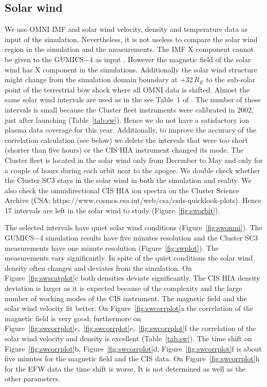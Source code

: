 \documentclass[linenumbers,draft]{agujournal}
\begin{document}
\subsection{Solar wind}
\label{sec:sw}

We use OMNI IMF and solar wind velocity, density and temperature data as input of the simulation. Nevertheless, it is not useless to compare the solar wind region in the simulation and the measurements. The IMF X component cannot be given to the GUMICS$-$4 as input \citep{janhunen12:_gumic_mhd,facsko16:_one_earth}. However the magnetic field of the solar wind has X component in the simulations. Additionally the solar wind structure might change from the simulation domain boundary at +32\,$R_E$ to the sub-solar point of the terrestrial bow shock where all OMNI data is shifted. Almost the same solar wind intervals are used as in the see Table~1 of \citet{facsko16:_one_earth}. The number of these intervals is small because the Cluster fleet instruments were calibrated in 2002, just after launching (Table~\ref{tab:sw}). Hence we do not have a satisfactory ion plasma data coverage for this year. Additionally, to improve the accuracy of the correlation calculation (see below) we delete the intervals that were too short (shorter than five hours) or the CIS HIA instrument changed its mode. The Cluster fleet is located in the solar wind only from December to May and only for a couple of hours during each orbit near to the apogee. We double check whether the Cluster SC3 stays in the solar wind in both the simulation and reality. We also check the omnidirectional CIS HIA ion spectra on the Cluster Science Archive (CSA; https://www.cosmos.esa.int/web/csa/csds-quicklook-plots). Hence 17 intervals are left in the solar wind to study (Figure~\ref{fig:sworbit}). 

The selected intervals have quiet solar wind conditions (Figure~\ref{fig:swomni}). The GUMICS$-$4 simulation results have five minutes resolution and the Cluster SC3 measurements have one minute resolution (Figure~\ref{fig:swplot}). The measurements vary significantly. In spite of the quiet conditions the solar wind density often changes and deviates from the simulation. On Figure~\ref{fig:swscatplot}c both densities deviate significantly. The CIS HIA density deviation is larger as it is expected because of the complexity and the large number of working modes of the CIS instrument. The magnetic field and the solar wind velocity fit better. On Figure~\ref{fig:swcorrplot}a the correlation of the magnetic field is very good; furthermore on Figure~\ref{fig:swcorrplot}c,~\ref{fig:swcorrplot}e,~\ref{fig:swcorrplot}f the correlation of the solar wind velocity and density is excellent (Table~\ref{tab:sw}). The time shift on Figure~\ref{fig:swcorrplot}b, Figure~\ref{fig:swcorrplot}d, Figure~\ref{fig:swcorrplot}f is about five minutes for the magnetic field and the CIS data. On Figure~\ref{fig:swcorrplot}h for the EFW data the time shift is worse. It is not determined as well as the other parameters.
\end{document}
